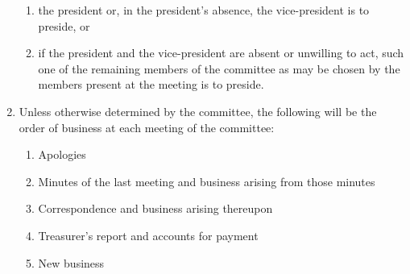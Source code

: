 \documentclass{article}
\begin{document}
\begin{enumerate}
\begin{enumerate}
    \item the president or, in the president’s absence, the vice-president is to preside, or
    \item if the president and the vice-president are absent or unwilling to act, such one of the remaining members of the committee as may be chosen by the members present at the meeting is to preside.
  \end{enumerate}
\item Unless otherwise determined by the committee, the following will be the order of business at each meeting of the committee:
  \begin{enumerate}
    \item Apologies
    \item Minutes of the last meeting and business arising from those minutes
    \item Correspondence and business arising thereupon
    \item Treasurer’s report and accounts for payment
    \item New business
  \end{enumerate}
\end{enumerate}
\end{document}
